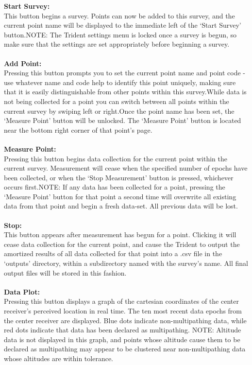 \documentclass[12pt]{article}
\begin{document}
\textbf{Start Survey:} \\ 
This button begins a survey. Points can now be added to this survey, and the current point name will be displayed to the immediate left of the ‘Start Survey’ button.NOTE: The Trident settings menu is locked once a survey is begun, so make sure that the settings are set appropriately before beginning a survey. \\ \\
\textbf{Add Point:} \\ 
Pressing this button prompts you to set the current point name and point code - use whatever name and code help to identify this point uniquely, making sure that it is easily distinguishable from other points within this survey.While data is not being collected for a point you can switch between all points within the current survey by swiping left or right.Once the point name has been set, the ‘Measure Point’ button will be unlocked. The ‘Measure Point’ button is located near the bottom right corner of that point’s page. \\ \\
\textbf{Measure Point:} \\ 
Pressing this button begins data collection for the current point within the current survey. Measurement will cease when the specified number of epochs have been collected, or when the ‘Stop Measurement’ button is pressed, whichever occurs first.NOTE: If any data has been collected for a point, pressing the ‘Measure Point’ button for that point a second time will overwrite all existing data from that point and begin a fresh data-set. All previous data will be lost.\\ \\
\textbf{Stop:} \\
This button appears after measurement has begun for a point. Clicking it will cease data collection for the current point, and cause the Trident to output the amortized results of all data collected for that point into a .csv file in the ‘outputs’ directory, within a subdirectory named with the survey’s name. All final output files will be stored in this fashion. \\ \\
\textbf{Data Plot:} \\ 
Pressing this button displays a graph of the cartesian coordinates of the center receiver’s perceived location in real time. The ten most recent data epochs from the center receiver are displayed. Blue dots indicate non-multipathing data, while red dots indicate that data has been declared as multipathing. NOTE: Altitude data is not displayed in this graph, and points whose altitude cause them to be declared as multipathing may appear to be clustered near non-multipathing data whose altitudes are within tolerance.
\end{document}
